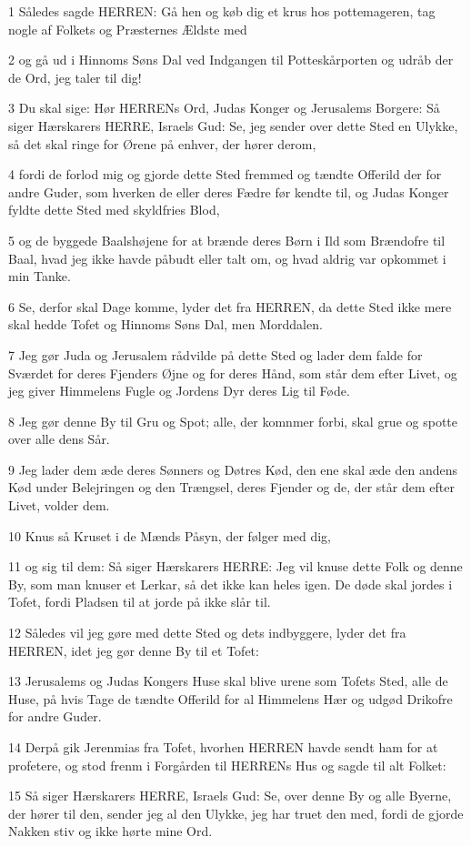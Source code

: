 \par 1 Således sagde HERREN: Gå hen og køb dig et krus hos pottemageren, tag nogle af Folkets og Præsternes Ældste med
\par 2 og gå ud i Hinnoms Søns Dal ved Indgangen til Potteskårporten og udråb der de Ord, jeg taler til dig!
\par 3 Du skal sige: Hør HERRENs Ord, Judas Konger og Jerusalems Borgere: Så siger Hærskarers HERRE, Israels Gud: Se, jeg sender over dette Sted en Ulykke, så det skal ringe for Ørene på enhver, der hører derom,
\par 4 fordi de forlod mig og gjorde dette Sted fremmed og tændte Offerild der for andre Guder, som hverken de eller deres Fædre før kendte til, og Judas Konger fyldte dette Sted med skyldfries Blod,
\par 5 og de byggede Baalshøjene for at brænde deres Børn i Ild som Brændofre til Baal, hvad jeg ikke havde påbudt eller talt om, og hvad aldrig var opkommet i min Tanke.
\par 6 Se, derfor skal Dage komme, lyder det fra HERREN, da dette Sted ikke mere skal hedde Tofet og Hinnoms Søns Dal, men Morddalen.
\par 7 Jeg gør Juda og Jerusalem rådvilde på dette Sted og lader dem falde for Sværdet for deres Fjenders Øjne og for deres Hånd, som står dem efter Livet, og jeg giver Himmelens Fugle og Jordens Dyr deres Lig til Føde.
\par 8 Jeg gør denne By til Gru og Spot; alle, der komnmer forbi, skal grue og spotte over alle dens Sår.
\par 9 Jeg lader dem æde deres Sønners og Døtres Kød, den ene skal æde den andens Kød under Belejringen og den Trængsel, deres Fjender og de, der står dem efter Livet, volder dem.
\par 10 Knus så Kruset i de Mænds Påsyn, der følger med dig,
\par 11 og sig til dem: Så siger Hærskarers HERRE: Jeg vil knuse dette Folk og denne By, som man knuser et Lerkar, så det ikke kan heles igen. De døde skal jordes i Tofet, fordi Pladsen til at jorde på ikke slår til.
\par 12 Således vil jeg gøre med dette Sted og dets indbyggere, lyder det fra HERREN, idet jeg gør denne By til et Tofet:
\par 13 Jerusalems og Judas Kongers Huse skal blive urene som Tofets Sted, alle de Huse, på hvis Tage de tændte Offerild for al Himmelens Hær og udgød Drikofre for andre Guder.
\par 14 Derpå gik Jerenmias fra Tofet, hvorhen HERREN havde sendt ham for at profetere, og stod frenm i Forgården til HERRENs Hus og sagde til alt Folket:
\par 15 Så siger Hærskarers HERRE, Israels Gud: Se, over denne By og alle Byerne, der hører til den, sender jeg al den Ulykke, jeg har truet den med, fordi de gjorde Nakken stiv og ikke hørte mine Ord.

